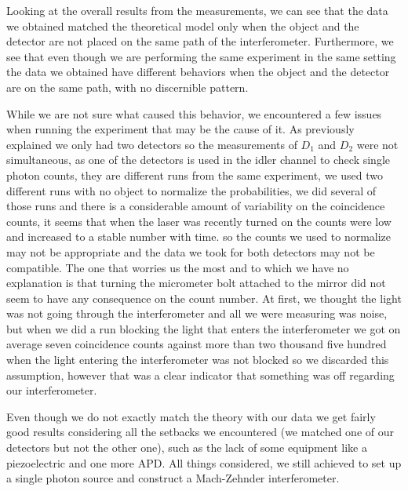 \documentclass[12pt]{book}
\begin{document}
Looking at the overall results from the measurements, we can see that the data we obtained matched the theoretical model only when the object and the detector are not placed on the same path of the interferometer. Furthermore, we see that even though we are performing the same experiment in the same setting the data we obtained have different behaviors when the object and the detector are on the same path, with no discernible pattern. 


While we are not sure what caused this behavior, we encountered a few issues when running the experiment that may be the cause of it. As previously explained we only had two detectors so the measurements of $D_{1}$ and $D_{2}$ were not simultaneous, as one of the detectors is used in the idler channel to check single photon counts, they are different runs from the same experiment, we used two different runs with no object to normalize the probabilities, we did several of those runs and there is a considerable amount of variability on the coincidence counts, it seems that when the laser was recently turned on the counts were low and increased to a stable number with time. so the counts we used to normalize may not be appropriate and the data we took for both detectors may not be compatible. The one that worries us the most and to which we have no explanation is that turning the micrometer bolt attached to the mirror did not seem to have any consequence on the count number. At first, we thought the light was not going through the interferometer and all we were measuring was noise, but when we did a run blocking the light that enters the interferometer we got on average seven coincidence counts against more than two thousand five hundred when the light entering the interferometer was not blocked so we discarded this assumption, however that was a clear indicator that something was off regarding our interferometer.


Even though we do not exactly match the theory with our data we get fairly good results considering all the setbacks we encountered (we matched one of our detectors but not the other one), such as the lack of some equipment like a piezoelectric and one more APD. All things considered, we still achieved to set up a single photon source and construct a Mach-Zehnder interferometer.



\pagebreak

 
\end{document}
